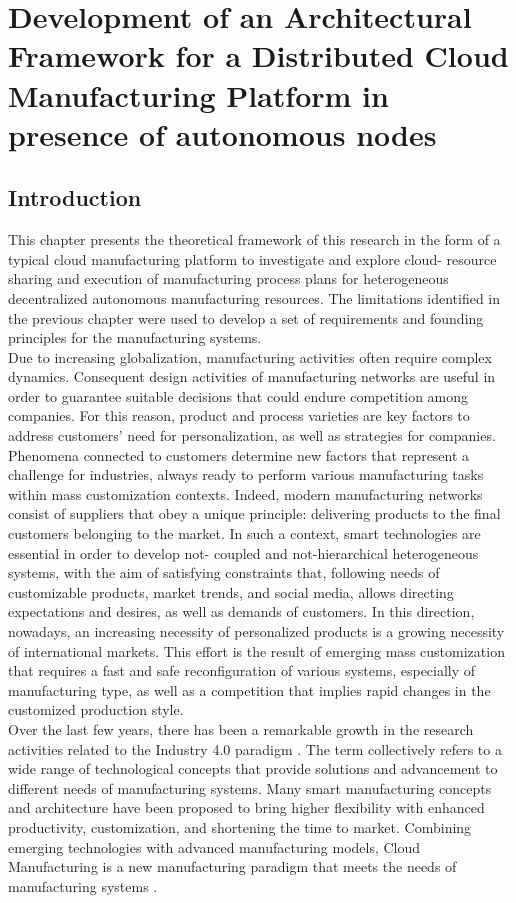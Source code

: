 \chapter{Development of an Architectural Framework for a Distributed Cloud Manufacturing Platform in presence of autonomous nodes}
\label{chapter3}
\section{Introduction}
This chapter presents the theoretical framework of this research in the form of a typical cloud manufacturing platform to investigate and explore cloud- resource sharing and execution of manufacturing process plans for heterogeneous decentralized autonomous manufacturing resources. The limitations identified in the previous chapter were used to develop a set of requirements and founding principles for the manufacturing systems.\\
Due to increasing globalization, manufacturing activities often require complex dynamics. Consequent design activities of manufacturing networks are useful in order to guarantee suitable decisions that could endure competition among companies. For this reason, product and process varieties are key factors to address customers' need for personalization, as well as strategies for companies. Phenomena connected to customers determine new factors that represent a challenge for industries, always ready to perform various manufacturing tasks within mass customization contexts. Indeed, modern manufacturing networks consist of suppliers that obey a unique principle: delivering products to the final customers belonging to the market. In such a context, smart technologies are essential in order to develop not- coupled and not-hierarchical heterogeneous systems, with the aim of satisfying constraints that, following needs of customizable products, market trends, and social media, allows directing expectations and desires, as well as demands of customers. In this direction, nowadays, an increasing necessity of personalized products is a growing necessity of international markets. This effort is the result of emerging mass customization that requires a fast and safe reconfiguration of various systems, especially of manufacturing type, as well as a competition that implies rapid changes in the customized production style.\\
Over the last few years, there has been a remarkable growth in the research activities related to the Industry 4.0 paradigm \parencite{zhou_industry_2015}. The term collectively refers to a wide range of technological concepts that provide solutions and advancement to different needs of manufacturing systems. Many smart manufacturing concepts and architecture have been proposed to bring higher flexibility with enhanced productivity, customization, and shortening the time to market. Combining emerging technologies with advanced manufacturing models, Cloud Manufacturing is a new manufacturing paradigm that meets the needs of manufacturing systems \parencite{kaynak_cloud_2020}.\\
